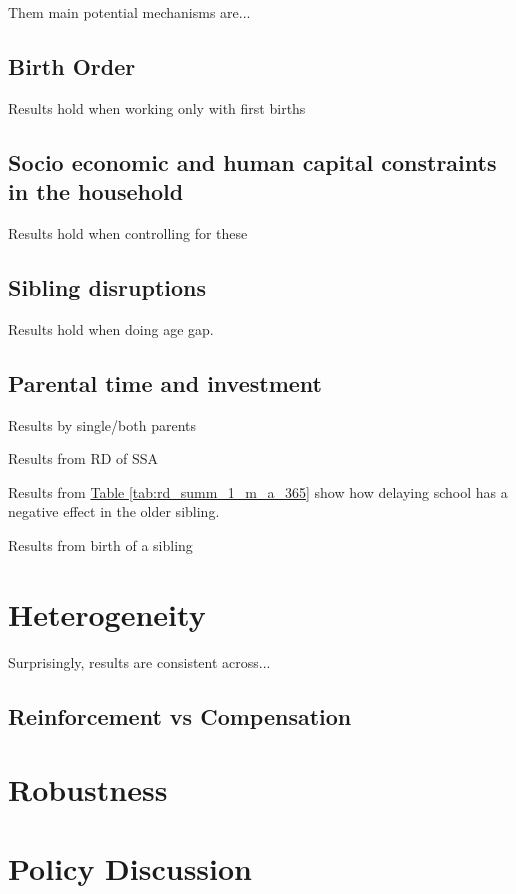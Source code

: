 Them main potential mechanisms are...

\subsection{Birth Order}

Results hold when working only with first births

\subsection{Socio economic and human capital constraints in the household}

Results hold when controlling for these

\subsection{Sibling disruptions}

Results hold when doing age gap.

\subsection{Parental time and investment}

Results by single/both parents

Results from RD of SSA

Results from \hyperref[tab:rd_summ_1_m_a_365]{Table \ref{tab:rd_summ_1_m_a_365}} show how delaying school has a negative effect in the older sibling. 


Results from birth of a sibling

\section{Heterogeneity}\label{sec:heterogeneity}

Surprisingly, results are consistent across...

\subsection{Reinforcement vs Compensation}

\section{Robustness}\label{sec:robustness}

\section{Policy Discussion}\label{sec:policy}

